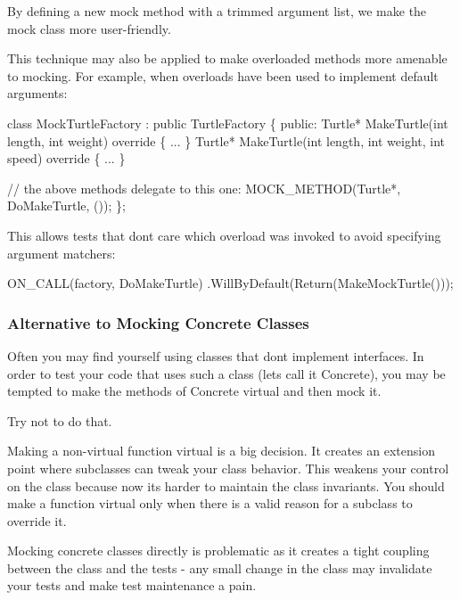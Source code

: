 By defining a new mock method with a trimmed argument list, we make the mock class more user-\/friendly.

This technique may also be applied to make overloaded methods more amenable to mocking. For example, when overloads have been used to implement default arguments\+:


\begin{DoxyCode}
\textcolor{keyword}{class }MockTurtleFactory : \textcolor{keyword}{public} TurtleFactory \{
 \textcolor{keyword}{public}:
  Turtle* MakeTurtle(\textcolor{keywordtype}{int} length, \textcolor{keywordtype}{int} weight)\textcolor{keyword}{ override }\{ ... \}
  Turtle* MakeTurtle(\textcolor{keywordtype}{int} length, \textcolor{keywordtype}{int} weight, \textcolor{keywordtype}{int} speed)\textcolor{keyword}{ override }\{ ... \}

  \textcolor{comment}{// the above methods delegate to this one:}
  MOCK\_METHOD(Turtle*, DoMakeTurtle, ());
\};
\end{DoxyCode}


This allows tests that don\textquotesingle{}t care which overload was invoked to avoid specifying argument matchers\+:


\begin{DoxyCode}
ON\_CALL(factory, DoMakeTurtle)
    .WillByDefault(Return(MakeMockTurtle()));
\end{DoxyCode}


\subsubsection*{Alternative to Mocking Concrete Classes}

Often you may find yourself using classes that don\textquotesingle{}t implement interfaces. In order to test your code that uses such a class (let\textquotesingle{}s call it {\ttfamily Concrete}), you may be tempted to make the methods of {\ttfamily Concrete} virtual and then mock it.

Try not to do that.

Making a non-\/virtual function virtual is a big decision. It creates an extension point where subclasses can tweak your class\textquotesingle{} behavior. This weakens your control on the class because now it\textquotesingle{}s harder to maintain the class invariants. You should make a function virtual only when there is a valid reason for a subclass to override it.

Mocking concrete classes directly is problematic as it creates a tight coupling between the class and the tests -\/ any small change in the class may invalidate your tests and make test maintenance a pain.

